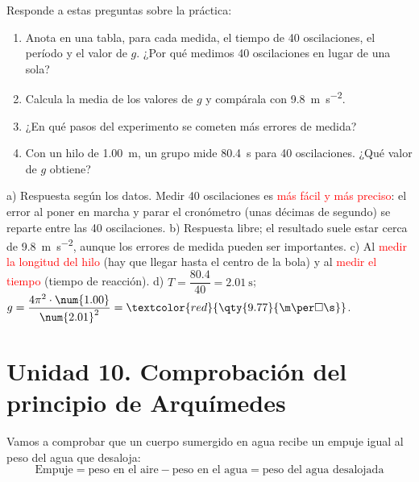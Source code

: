 \begin{exercise}
    Responde a estas preguntas sobre la práctica:
    \begin{enumerate}[label=\alph*)]
        \item Anota en una tabla, para cada medida, el tiempo de 40 oscilaciones, el período y el valor de \(g\). ¿Por qué medimos 40 oscilaciones en lugar de una sola?
        \item Calcula la media de los valores de \(g\) y compárala con \qty{9.8}{\m\per\square\s}.
        \item ¿En qué pasos del experimento se cometen más errores de medida?
        \item Con un hilo de \qty{1.00}{\m}, un grupo mide \qty{80.4}{\s} para 40 oscilaciones. ¿Qué valor de \(g\) obtiene?
    \end{enumerate}
    \begin{solu}
        a) Respuesta según los datos. Medir 40 oscilaciones es \textcolor{red}{más fácil y más preciso}: el error al poner en marcha y parar el cronómetro (unas décimas de segundo) se reparte entre las 40 oscilaciones.
        b) Respuesta libre; el resultado suele estar cerca de \qty{9.8}{\m\per\square\s}, aunque los errores de medida pueden ser importantes.
        c) Al \textcolor{red}{medir la longitud del hilo} (hay que llegar hasta el centro de la bola) y al \textcolor{red}{medir el tiempo} (tiempo de reacción).
        d) \(T = \dfrac{\num{80.4}}{40} = \qty{2.01}{\s}\); \(g = \dfrac{4\pi^2 \cdot \num{1.00}}{\num{2.01}^2} = \textcolor{red}{\qty{9.77}{\m\per\square\s}}\).
    \end{solu}
\end{exercise}

\section[Unidad 10. Principio de Arquímedes]{Unidad 10. Comprobación del principio de Arquímedes}

Vamos a comprobar que un cuerpo sumergido en agua recibe un empuje igual al peso del agua que desaloja:
\[ \text{Empuje} = \text{peso en el aire} - \text{peso en el agua} = \text{peso del agua desalojada} \]


